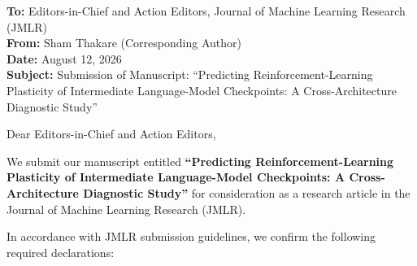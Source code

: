 \documentclass[11pt]{article}
\begin{document}
\thispagestyle{empty}

\noindent \textbf{To:} Editors-in-Chief and Action Editors, Journal of Machine Learning Research (JMLR) \\
\noindent \textbf{From:} Sham Thakare (Corresponding Author) \\
\noindent \textbf{Date:} August 12, 2026 \\
\noindent \textbf{Subject:} Submission of Manuscript: ``Predicting Reinforcement-Learning Plasticity of Intermediate Language-Model Checkpoints: A Cross-Architecture Diagnostic Study''

\vspace{1em}

\noindent Dear Editors-in-Chief and Action Editors,

\vspace{0.5em}

\noindent We submit our manuscript entitled \textbf{``Predicting Reinforcement-Learning Plasticity of Intermediate Language-Model Checkpoints: A Cross-Architecture Diagnostic Study''} for consideration as a research article in the Journal of Machine Learning Research (JMLR).

\vspace{0.5em}

\noindent In accordance with JMLR submission guidelines, we confirm the following required declarations:
\end{document}
